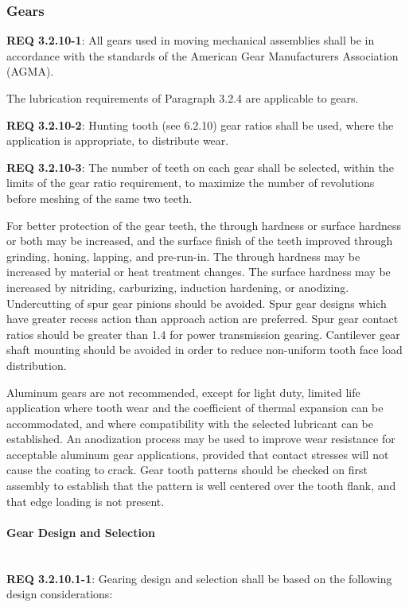 \documentclass[12pt]{article}
\begin{document}
\clearpage
\subsubsection{Gears} %
\noindent \textbf{REQ 3.2.10-1}: All gears used in moving mechanical assemblies shall be in accordance with the standards of the American Gear Manufacturers Association (AGMA). 

The lubrication requirements of Paragraph 3.2.4 are applicable to gears.

\noindent \textbf{REQ 3.2.10-2}: Hunting tooth (see 6.2.10) gear ratios shall be used, where the application is appropriate, to distribute wear. 

\noindent \textbf{REQ 3.2.10-3}: The number of teeth on each gear shall be selected, within the limits of the gear ratio requirement, to maximize the number of revolutions before meshing of the same two teeth.

For better protection of the gear teeth, the through hardness or surface hardness or both may be increased, and the surface finish of the teeth improved through grinding, honing, lapping, and pre-run-in. 
The through hardness may be increased by material or heat treatment changes. 
The surface hardness may be increased by nitriding, carburizing, induction hardening, or anodizing. 
Undercutting of spur gear pinions should be avoided. 
Spur gear designs which have greater recess action than approach action are preferred. 
Spur gear contact ratios should be greater than 1.4 for power transmission gearing.
Cantilever gear shaft mounting should be avoided in order to reduce non-uniform tooth face load distribution.

Aluminum gears are not recommended, except for light duty, limited life application where tooth wear and the coefficient of thermal expansion can be accommodated, and where compatibility with the selected lubricant can be established. 
An anodization process may be used to improve wear resistance for acceptable aluminum gear applications, provided that contact stresses will not cause the coating to crack. 
Gear tooth patterns should be checked on first assembly to establish that the pattern is well centered over the tooth flank, and that edge loading is not present.


\paragraph{Gear Design and Selection} \mbox{} \\ %
\noindent \textbf{REQ 3.2.10.1-1}: Gearing design and selection shall be based on the following design considerations:
\end{document}
